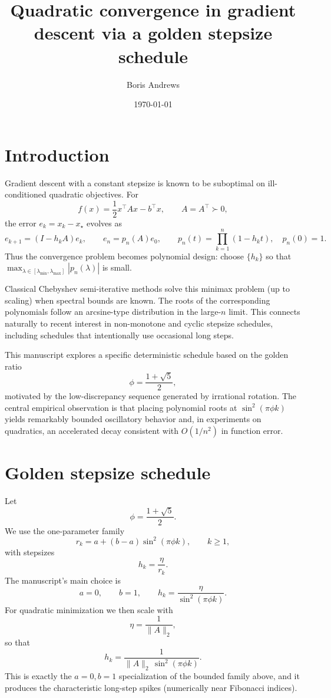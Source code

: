 \documentclass{article}
\title{Quadratic convergence in gradient descent via a golden stepsize schedule}
\author{Boris Andrews}
\date{\today}
\begin{document}
\maketitle

\section{Introduction}

Gradient descent with a constant stepsize is known to be suboptimal on ill-conditioned
quadratic objectives. For
\[
f(x)=\frac{1}{2}x^\top A x-b^\top x,\qquad A=A^\top \succ 0,
\]
the error $e_k=x_k-x_\star$ evolves as
\[
e_{k+1}=(I-h_kA)e_k,\qquad
e_n=p_n(A)e_0,\qquad
p_n(t)=\prod_{k=1}^n(1-h_kt),\quad p_n(0)=1.
\]
Thus the convergence problem becomes polynomial design: choose $\{h_k\}$ so that
$\max_{\lambda\in[\lambda_{\min},\lambda_{\max}]}|p_n(\lambda)|$ is small.

Classical Chebyshev semi-iterative methods solve this minimax problem (up to scaling)
when spectral bounds are known. The roots of the corresponding polynomials follow an
arcsine-type distribution in the large-$n$ limit. This connects naturally to recent
interest in non-monotone and cyclic stepsize schedules, including schedules that
intentionally use occasional long steps.

This manuscript explores a specific deterministic schedule based on the golden ratio
\[
\phi=\frac{1+\sqrt5}{2},
\]
motivated by the low-discrepancy sequence generated by irrational rotation. The central
empirical observation is that placing polynomial roots at $\sin^2(\pi\phi k)$ yields
remarkably bounded oscillatory behavior and, in experiments on quadratics, an
accelerated decay consistent with $O(1/n^2)$ in function error.

\section{Golden stepsize schedule}

Let
\[
\phi=\frac{1+\sqrt5}{2}.
\]
We use the one-parameter family
\[
r_k=a+(b-a)\sin^2(\pi\phi k),\qquad k\ge 1,
\]
with stepsizes
\[
h_k=\frac{\eta}{r_k}.
\]
The manuscript's main choice is
\[
a=0,\qquad b=1,\qquad
h_k=\frac{\eta}{\sin^2(\pi\phi k)}.
\]
For quadratic minimization we then scale with
\[
\eta=\frac{1}{\|A\|_2},
\]
so that
\[
h_k=\frac{1}{\|A\|_2\,\sin^2(\pi\phi k)}.
\]
This is exactly the $a=0,b=1$ specialization of the bounded family above, and it
produces the characteristic long-step spikes (numerically near Fibonacci indices).
\end{document}
